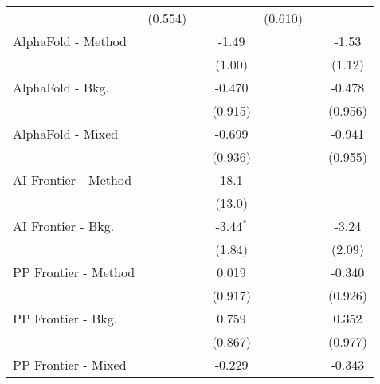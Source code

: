 \begin{tabular}{lcccccc}
                                  & (0.554)        &               &               & (0.610)        &              &   \\   
   AlphaFold - Method             &                &               & -1.49         &                &              & -1.53\\   
                                  &                &               & (1.00)        &                &              & (1.12)\\   
   AlphaFold - Bkg.               &                &               & -0.470        &                &              & -0.478\\   
                                  &                &               & (0.915)       &                &              & (0.956)\\   
   AlphaFold - Mixed              &                &               & -0.699        &                &              & -0.941\\   
                                  &                &               & (0.936)       &                &              & (0.955)\\   
   AI Frontier - Method           &                &               & 18.1          &                &              &   \\   
                                  &                &               & (13.0)        &                &              &   \\   
   AI Frontier - Bkg.             &                &               & -3.44$^{*}$   &                &              & -3.24\\   
                                  &                &               & (1.84)        &                &              & (2.09)\\   
   PP Frontier - Method           &                &               & 0.019         &                &              & -0.340\\   
                                  &                &               & (0.917)       &                &              & (0.926)\\   
   PP Frontier - Bkg.             &                &               & 0.759         &                &              & 0.352\\   
                                  &                &               & (0.867)       &                &              & (0.977)\\   
   PP Frontier - Mixed            &                &               & -0.229        &                &              & -0.343\\   

\end{tabular}
